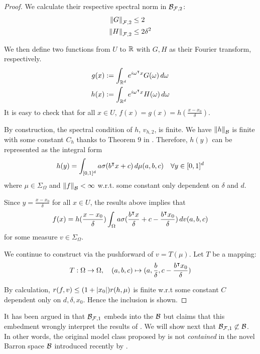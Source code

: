 \begin{proof}
We calculate their respective spectral norm in $\mathcal{B}_{\mathcal{F}, 2}$:
\begin{align}
    \left\| G \right\|_{\mathcal{F},2} &\leq 2 \\
    \left\| H \right\|_{\mathcal{F},2} &\leq 2\delta^2
\end{align}

We then define two functions from $U$ to $\mathbb{R}$ with $G,H$ as their Fourier
transform, respectively.
\begin{align*}
    g(x) &:= \int_{\mathbb{R}^d} e^{i\omega{}^{\intercal} x} G(\omega)\,d\omega\\
    h(x) &:= \int_{\mathbb{R}^d} e^{i\omega{}^{\intercal} x} H(\omega)\,d\omega\\
\end{align*}
It is easy to check that for all $x \in U$, $f(x)=g(x)=h(\frac{x-x_0}{\delta})$.

By construction, the spectral condition of $h$, $v_{h,2}$, is finite. We have
$\left\| h \right\|_{\mathcal{B}}$ is finite with some constant $C_h$ thanks to Theorem 9
in \cite{eMathematicalUnderstandingNeural2020}. Therefore, $h(y)$ can be
represented as the integral form
\begin{equation}
    h(y) = \int_{[0,1]^d} a \sigma(b{}^{\intercal} x + c) \,d\mu(a,b,c) \quad
    \forall y \in [0,1]^d
\end{equation}
where $\mu \in \Sigma_{\Omega}$ and $\left\| f \right\|_{\mathcal{B}} < \infty$ w.r.t. some
constant only dependent on $\delta$ and $d$.

Since $y=\frac{x-x_0}{\delta}$ for all $x\in U$, the results above implies that 
\begin{equation}
    f(x) = h(\frac{x-x_0}{\delta}) \int_{\Omega} a 
    \sigma(\frac{b{}^{\intercal} x}{\delta} + c - \frac{b{}^{\intercal} x_0}{\delta})\,dv(a,b,c)
\end{equation}
for some measure $v \in \Sigma_{\Omega}$.

We continue to construct via the pushforward of $v = T(\mu)$. Let $T$ be a mapping:
\begin{equation}
    T: \Omega \to \Omega, \quad
    (a,b,c) \mapsto (a, \frac{b}{\delta}, c - \frac{b{}^{\intercal} x_0}{\delta})
\end{equation}

By calculation, $r(f, v) \leq (1+\left| x_0 \right|) r(h, \mu)$ is finite w.r.t some
constant $C$ dependent only on $d,\delta,x_0$. Hence the inclusion is shown.

\end{proof}

It has been argued in \cite{eRepresentationFormulasPointwise2020} that
$\mathcal{B}_{\mathcal{F},1}$ embeds into the $\mathcal{B}$ but
\cite{carageaNeuralNetworkApproximation2022} claims that this embedment wrongly
interpret the results of
\cite{barronUniversalApproximationBounds1993,barronNeuralNetApproximation1992}.
We will show next that $\mathcal{B}_{\mathcal{F},1}\not\subset\mathcal{B}$. In other
words, the original model class proposed by
\cite{barronNeuralNetApproximation1992} is not \textit{contained} in the novel
Barron space $\mathcal{B}$ introduced recently by
\cite{eBarronSpaceFlowinduced2021}. 


